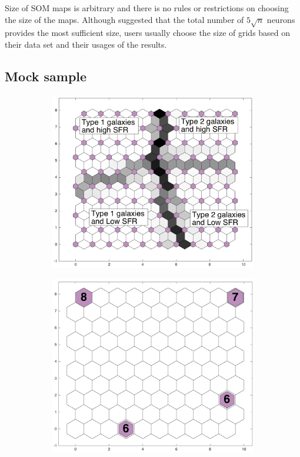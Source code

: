     Size of SOM maps is arbitrary and there is no rules or restrictions on choosing the size of the maps. 
    Although \cite{Vesanto05} suggested that the total number of  $5\sqrt{n}$ neurons provides the most sufficient size, users usually choose the size of grids based on their data set and their usages of the results.

   
\subsection{Mock sample}
 
         \begin{figure}
            \begin{subfigure}[b]{0.5\textwidth}
                \centering
                \includegraphics[width=\textwidth]{../images0.01/sample/sample2_dist.png}
            \end{subfigure}
            \hfill
            \begin{subfigure}[b]{0.5\textwidth}
                \includegraphics[width=\textwidth]{../images0.01/sample/sample2_hits.png}

\end{subfigure}
\end{figure}
